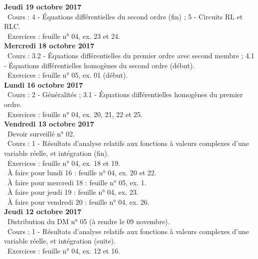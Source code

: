 \documentclass[12pt,a4paper]{article}
\begin{document}
\noindent\textbf{Jeudi 19 octobre 2017}\\
\bu\ Cours : 4 - Équations différentielles du second ordre (fin) ; 5 - Circuits RL et RLC.\\
\bu\ Exercices : feuille n° 04, ex. 23 et 24.\vspace{.4cm}\\

\noindent\textbf{\bf Mercredi 18 octobre 2017}\\
\bu\ Cours : 3.2 - Équations différentielles du premier ordre avec second membre ; 4.1 - Équations 
différentielles homogènes du second ordre (début).\\
\bu\ Exercices : feuille n° 05, ex. 01 (début).\vspace{.4cm}\\

\noindent\textbf{Lundi 16 octobre 2017}\\
\bu\ Cours : 2 - Généralités ; 3.1 - Équations différentielles homogènes du premier ordre.\\
\bu\ Exercices : feuille n° 04, ex. 20, 21, 22 et 25.\vspace{.4cm}\\

\noindent\textbf{Vendredi 13 octobre 2017}\\
\bu\ Devoir surveillé n° 02.\\
\bu\ Cours : 1 - Résultats d'analyse relatifs aux fonctions à valeurs complexes d'une variable réelle, et intégration 
(fin).\\
\bu\ Exercices : feuille n° 04, ex. 18 et 19.\\
\bu\ À faire pour lundi 16 : feuille n° 04, ex. 20 et 22.\\
\bu\ À faire pour mercredi 18 : feuille n° 05, ex. 1.\\
\bu\ À faire pour jeudi 19 : feuille n° 04, ex. 23.\\
\bu\ À faire pour vendredi 20 : feuille n° 04, ex. 26.\vspace{.4cm}\\

\noindent\textbf{Jeudi 12 octobre 2017}\\
\bu\ Distribution du DM n° 05 (à rendre le 09 novembre).\\
\bu\ Cours : 1 - Résultats d'analyse relatifs aux fonctions à valeurs complexes d'une variable réelle, et intégration 
(suite).\\
\bu\ Exercices : feuille n° 04, ex. 12 et 16.\vspace{.4cm}\\
\end{document}
